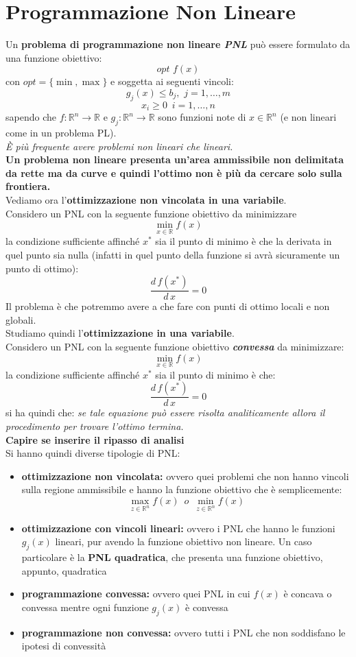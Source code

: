 \message{ !name(ro.tex)}\documentclass[a4paper,12pt, oneside]{book}
\begin{document}
\chapter{Programmazione Non Lineare}
Un \textbf{problema di programmazione non lineare \textit{PNL}} può
essere formulato da una funzione obiettivo:
\[opt\,\,f(x)\]
con $opt=\{\min,\max\}$ e soggetta ai seguenti vincoli:
\[g_j(x)\leq b_j,\,\,j=1,\ldots,m\]
\[x_i\geq 0\,\,\,i=1,\ldots,n\]
sapendo che $f:\mathbb{R}^n\to \mathbb{R}$ e $g_j:\mathbb{R}^n\to
\mathbb{R}$ sono funzioni note di $x\in \mathbb{R}^n$ (e non lineari
come in un problema PL).\\
\textit{È più frequente avere problemi non lineari che lineari.}\\
\textbf{Un problema non lineare presenta un'area ammissibile non
  delimitata da rette ma da curve e quindi l'ottimo non è più da
  cercare solo sulla frontiera.}
\\
Vediamo ora l'\textbf{ottimizzazione non vincolata in una
  variabile}.\\
Considero un PNL con la seguente funzione obiettivo da minimizzare
\[\min_{x\in\mathbb{R}}f(x)\]
la condizione sufficiente affinché $x^*$ sia il punto di minimo è che
la derivata in quel punto sia nulla (infatti in quel punto della
funzione si avrà sicuramente un punto di ottimo):
\[\frac{d\,f(x^*)}{d\,x}=0\]
Il problema è che potremmo avere a che fare con punti di ottimo locali
e non globali.\\
Studiamo quindi l'\textbf{ottimizzazione in una variabile}.\\
Considero un PNL con la seguente funzione obiettivo
\textbf{\textit{convessa}} da minimizzare:
\[\min_{x\in\mathbb{R}}f(x)\]
la condizione sufficiente affinché $x^*$ sia il punto di minimo è che:
\[\frac{d\,f(x^*)}{d\,x}=0\]
si ha quindi che:
\textit{se tale equazione può essere risolta analiticamente allora
  il procedimento per trovare l’ottimo termina.}\\
\textbf{Capire se inserire il ripasso di analisi}\\
Si hanno quindi diverse tipologie di PNL:
\begin{itemize}
  \item \textbf{ottimizzazione non vincolata:} ovvero quei problemi
  che non hanno vincoli sulla regione ammissibile e hanno la funzione
  obiettivo che è semplicemente:
  \[\max_{z\in\mathbb{R}^n}f(x)\,\,\,o\,\,\,\min_{z\in\mathbb{R}^n}f(x)\]
  \item \textbf{ottimizzazione con vincoli lineari:} ovvero i PNL che
  hanno le funzioni $g_j(x)$ lineari, pur avendo la funzione obiettivo
  non lineare. Un caso particolare è la \textbf{PNL quadratica}, che
  presenta una funzione obiettivo, appunto, quadratica
  \item \textbf{programmazione convessa:} ovvero quei PNL in cui
  $f(x)$ è concava o convessa mentre ogni funzione $g_j(x)$ è convessa
  \item \textbf{programmazione non convessa:} ovvero tutti i PNL che
  non soddisfano le ipotesi di convessità
\end{itemize}
\end{document}
